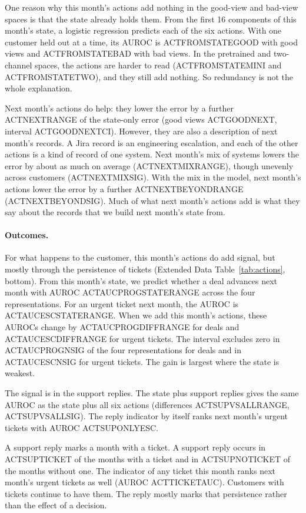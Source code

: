 \documentclass[11pt]{article}
\begin{document}
One reason why this month's actions add nothing in the good-view and bad-view spaces is that the state already holds them. From the first 16 components of this month's state, a logistic regression predicts each of the six actions. With one customer held out at a time, its AUROC is ACTFROMSTATEGOOD with good views and ACTFROMSTATEBAD with bad views. In the pretrained and two-channel spaces, the actions are harder to read (ACTFROMSTATEMINI and ACTFROMSTATETWO), and they still add nothing. So redundancy is not the whole explanation.

Next month's actions do help: they lower the error by a further ACTNEXTRANGE of the state-only error (good views ACTGOODNEXT, interval ACTGOODNEXTCI). However, they are also a description of next month's records. A Jira record is an engineering escalation, and each of the other actions is a kind of record of one system. Next month's mix of systems lowers the error by about as much on average (ACTNEXTMIXRANGE), though unevenly across customers (ACTNEXTMIXSIG). With the mix in the model, next month's actions lower the error by a further ACTNEXTBEYONDRANGE (ACTNEXTBEYONDSIG). Much of what next month's actions add is what they say about the records that we build next month's state from.

\paragraph{Outcomes.} For what happens to the customer, this month's actions do add signal, but mostly through the persistence of tickets (Extended Data Table~\ref{tab:actions}, bottom). From this month's state, we predict whether a deal advances next month with AUROC ACTAUCPROGSTATERANGE across the four representations. For an urgent ticket next month, the AUROC is ACTAUCESCSTATERANGE. When we add this month's actions, these AUROCs change by ACTAUCPROGDIFFRANGE for deals and ACTAUCESCDIFFRANGE for urgent tickets. The interval excludes zero in ACTAUCPROGNSIG of the four representations for deals and in ACTAUCESCNSIG for urgent tickets. The gain is largest where the state is weakest.

The signal is in the support replies. The state plus support replies gives the same AUROC as the state plus all six actions (differences ACTSUPVSALLRANGE, ACTSUPVSALLSIG). The reply indicator by itself ranks next month's urgent tickets with AUROC ACTSUPONLYESC.

A support reply marks a month with a ticket. A support reply occurs in ACTSUPTICKET of the months with a ticket and in ACTSUPNOTICKET of the months without one. The indicator of any ticket this month ranks next month's urgent tickets as well (AUROC ACTTICKETAUC). Customers with tickets continue to have them. The reply mostly marks that persistence rather than the effect of a decision.
\end{document}
